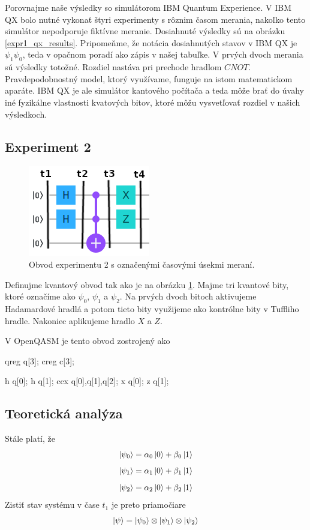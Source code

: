 Porovnajme naše výsledky so simulátorom IBM Quantum Experience. V IBM QX
bolo nutné vykonať štyri experimenty s rôznim časom merania, nakoľko tento
simulátor nepodporuje fiktívne meranie. Dosiahnuté výsledky sú na obrázku
\ref{expr1_qx_results}. Pripomeňme, že notácia dosiahnutých stavov v IBM QX
je \(\psi_1\psi_0\), teda v opačnom poradí ako zápis v našej tabuľke. V 
prvých dvoch merania sú výsledky totožné. Rozdiel nastáva pri prechode hradlom
\(CNOT\). Pravdepodobnostný model, ktorý využívame, funguje na istom 
matematickom aparáte. IBM QX je ale simulátor kantového počítača a teda môže 
brať do úvahy iné fyzikálne vlastnosti kvatových bitov, ktoré môžu vysvetľovať
rozdiel v našich výsledkoch.

\subsection{Experiment 2}
\begin{figure} 
	\centering 
	\includegraphics[width=.5\textwidth]{figures/expr2_circuit.png} 
	\caption{Obvod experimentu 2 s označenými časovými úsekmi meraní.}

    \label{expr2_circuit}
\end{figure}

Definujme kvantový obvod tak ako je na obrázku \ref{expr2_circuit}. Majme 
tri kvantové bity, ktoré označíme ako \(\psi_0\), \(\psi_1\) a \(\psi_2\).
Na prvých dvoch bitoch aktivujeme Hadamardové hradlá a potom tieto bity 
využijeme ako kontrólne bity v Tuffliho hradle. Nakoniec aplikujeme hradlo 
\(X\) a \(Z\).

V OpenQASM je tento obvod zostrojený ako
\begin{code}
qreg q[3];
creg c[3];

h q[0];
h q[1];
ccx q[0],q[1],q[2];
x q[0];
z q[1];
\end{code}

\subsection*{Teoretická analýza}
Stále platí, že
\[\ket{\psi_0} = \alpha_0\ket{0} + \beta_0\ket{1}\]
\[\ket{\psi_1} = \alpha_1\ket{0} + \beta_1\ket{1}\]
\[\ket{\psi_2} = \alpha_2\ket{0} + \beta_2\ket{1}\]
Zistiť stav systému v čase \(t_1\) je preto priamočiare
\[\ket{\psi} = \ket{\psi_0} \otimes \ket{\psi_1} \otimes \ket{\psi_2}\]

